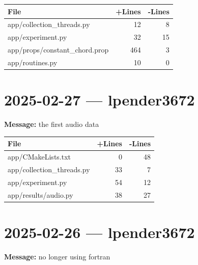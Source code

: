 \documentclass{article}
\begin{document}
\begin{longtable}{|p{10cm}|r|r|}
\hline \textbf{File} & \textbf{+Lines} & \textbf{-Lines} \\
\hline
app/collection\_threads.py & 12 & 8 \\
\hline
app/experiment.py & 32 & 15 \\
\hline
app/props/constant\_chord.prop & 464 & 3 \\
\hline
app/routines.py & 10 & 0 \\
\hline
\end{longtable}

\section*{2025-02-27 --- lpender3672}
\textbf{Message:} the first audio data

\begin{longtable}{|p{10cm}|r|r|}
\hline \textbf{File} & \textbf{+Lines} & \textbf{-Lines} \\
\hline
app/CMakeLists.txt & 0 & 48 \\
\hline
app/collection\_threads.py & 33 & 7 \\
\hline
app/experiment.py & 54 & 12 \\
\hline
app/results/audio.py & 38 & 27 \\
\hline
\end{longtable}

\section*{2025-02-26 --- lpender3672}
\textbf{Message:} no longer using fortran
\end{document}
